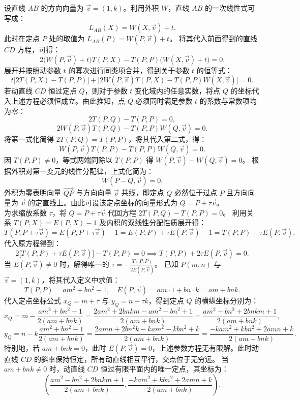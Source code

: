 \begin{solution}
设直线 $AB$ 的方向向量为 $\vec{v} = (1, k)$。利用外积 $W$，直线 $AB$ 的一次线性式可写成：
\[ L_{AB}(X) = W(X, \vec{v}) + t. \]
此时在定点 $P$ 处的取值为 $L_{AB}(P) = W(P, \vec{v}) + t$。
将其代入前面得到的直线 $CD$ 方程，可得：
\[ 2\big(W(P, \vec{v}) + t\big)T(P, X) - T(P, P)\big(W(X, \vec{v}) + t\big) = 0. \]
展开并按照动参数 $t$ 的幂次进行同类项合并，得到关于参数 $t$ 的恒等式：
\[ t\big[2T(P, X) - T(P, P)\big] + \big[2W(P, \vec{v})T(P, X) - T(P, P)W(X, \vec{v})\big] = 0. \]
若动直线 $CD$ 恒过定点 $Q$，则对于参数 $t$ 变化域内的任意实数，将点 $Q$ 的坐标代入上述方程必须恒成立。由此推知，点 $Q$ 必须同时满足参数 $t$ 的系数与常数项均为零：
\[ 2T(P, Q) - T(P, P) = 0, \]
\[ 2W(P, \vec{v})T(P, Q) - T(P, P)W(Q, \vec{v}) = 0. \]
将第一式化简得 $2T(P, Q) = T(P, P)$，将其代入第二式，得：
\[ W(P, \vec{v})T(P, P) - T(P, P)W(Q, \vec{v}) = 0. \]
因 $T(P, P) \neq 0$，等式两端同除以 $T(P, P)$ 得 $W(P, \vec{v}) - W(Q, \vec{v}) = 0$。
根据外积对第一变元的线性分配律，上式化简为：
\[ W(P - Q, \vec{v}) = 0. \]
外积为零表明向量 $\overrightarrow{QP}$ 与方向向量 $\vec{v}$ 共线，即定点 $Q$ 必然位于过点 $P$ 且方向向量为 $\vec{v}$ 的定直线上。由此可设该定点坐标的向量形式为 $Q = P + \tau \vec{v}$。\\
为求缩放系数 $\tau$，将 $Q = P + \tau \vec{v}$ 代回方程 $2T(P, Q) - T(P, P) = 0$。
利用关系 $T(P, X) = E(P, X) - 1$ 及内积的双线性分配性质展开得：
\[ T(P, P + \tau \vec{v}) = E(P, P + \tau \vec{v}) - 1 = E(P, P) + \tau E(P, \vec{v}) - 1 = T(P, P) + \tau E(P, \vec{v}). \]
代入原方程得到：
\[ 2\big[T(P, P) + \tau E(P, \vec{v})\big] - T(P, P) = 0 \implies T(P, P) + 2\tau E(P, \vec{v}) = 0. \]
当 $E(P, \vec{v}) \neq 0$ 时，解得唯一的 $\tau = -\frac{T(P, P)}{2E(P, \vec{v})}$。
已知 $P(m,n)$ 与 $\vec{v} = (1, k)$，将其代入定义中求值：
\[ T(P, P) = am^2 + bn^2 - 1, \quad E(P, \vec{v}) = am \cdot 1 + bn \cdot k = am + bnk. \]
代入定点坐标公式 $x_Q = m + \tau$ 与 $y_Q = n + \tau k$，得到定点 $Q$ 的横纵坐标分别为：
\[ x_Q = m - \frac{am^2 + bn^2 - 1}{2(am + bnk)} = \frac{2am^2 + 2bnkm - am^2 - bn^2 + 1}{2(am + bnk)} = \frac{am^2 - bn^2 + 2bnkm + 1}{2(am + bnk)}, \]
\[ y_Q = n - k\frac{am^2 + bn^2 - 1}{2(am + bnk)} = \frac{2amn + 2bn^2k - kam^2 - kbn^2 + k}{2(am + bnk)} = \frac{-kam^2 + kbn^2 + 2amn + k}{2(am + bnk)}. \]
特别地，若 $am + bnk = 0$，此时 $E(P, \vec{v}) = 0$，上述参数方程无有限解。此时动直线 $CD$ 的斜率保持恒定，所有动直线相互平行，交点位于无穷远。
当 $am + bnk \neq 0$ 时，动直线 $CD$ 恒过有限平面内的唯一定点，其坐标为：
\[ \left( \frac{am^2 - bn^2 + 2bnkm + 1}{2(am + bnk)}, \frac{-kam^2 + kbn^2 + 2amn + k}{2(am + bnk)} \right). \]
\end{solution}


